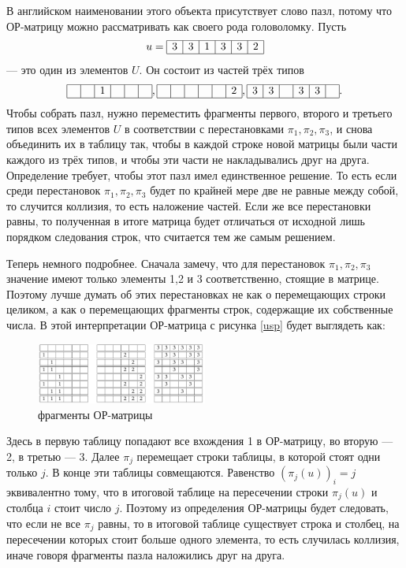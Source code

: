 В английском наименовании этого объекта присутствует слово пазл, потому что ОР-матрицу можно рассматривать как своего рода головоломку. Пусть 
\[
u = \begin{array}{|c|c|c|c|c|c|} \hline 3 & 3 & 1 & 3 & 3 & 2 \\ \hline\end{array} 
\]
--- это один из элементов $U$. Он состоит из частей трёх типов
\[
	\begin{array}{|c|c|c|c|c|c|} \hline \; & \; & 1 & \; & \; & \;  \\ \hline\end{array}, 
	\begin{array}{|c|c|c|c|c|c|} \hline \; & \; & \;& \; & \; & 2 \\ \hline\end{array},
	\begin{array}{|c|c|c|c|c|c|} \hline 3 & 3 & \; & 3 & 3 & \; \\ \hline\end{array}.
\]
Чтобы собрать пазл, нужно переместить фрагменты первого, второго и третьего типов всех элементов $U$ в соответствии с перестановками $\pi_1, \pi_2, \pi_3$, и снова объединить их в таблицу так, чтобы в каждой строке новой матрицы были части каждого из трёх типов, и чтобы эти части не накладывались друг на друга. Определение требует, чтобы этот пазл имел единственное решение. То есть если среди перестановок $\pi_1, \pi_2, \pi_3$ будет по крайней мере две не равные между собой, то случится коллизия, то есть наложение частей. Если же все перестановки равны, то полученная в итоге матрица будет отличаться от исходной лишь порядком следования строк, что считается тем же самым решением.

Теперь немного подробнее. Сначала замечу, что для перестановок $\pi_1, \pi_2, \pi_3$ значение имеют только элементы 1,2 и 3 соответственно, стоящие в матрице. Поэтому лучше думать об этих перестановках не как о перемещающих строки целиком, а как о перемещающих фрагменты строк, содержащие их собственные числа. В этой интерпретации ОР-матрица с рисунка \ref{usp} будет выглядеть как:

\begin{figure}[H]
	\centering
    \includegraphics[width=0.5\textwidth]{figures/usp_pieces}
	\caption{фрагменты ОР-матрицы}
	\label{usp:fig3.2}
\end{figure}
Здесь в первую таблицу попадают все вхождения 1 в ОР-матрицу, во вторую --- 2, в третью --- 3. Далее $\pi_j$ перемещает строки таблицы, в которой стоят одни только $j$. В конце эти таблицы совмещаются. Равенство $(\pi_j(u))_i = j$ эквивалентно тому, что в итоговой таблице на пересечении строки $\pi_j(u)$ и столбца $i$ стоит число $j$. Поэтому из определения ОР-матрицы будет следовать, что если не все $\pi_j$ равны, то в итоговой таблице существует строка и столбец, на пересечении которых стоит больше одного элемента, то есть случилась коллизия, иначе говоря фрагменты пазла наложились друг на друга. 

